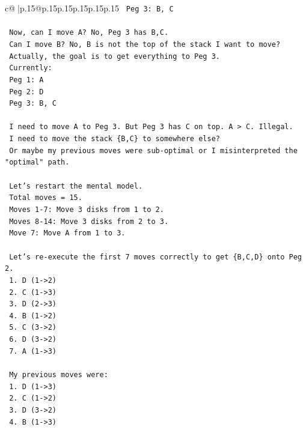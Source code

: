 \documentclass{article}
\begin{document}
{\begin{supertabular}{c@{$\;$}|p{.15\linewidth}@{}p{.15\linewidth}p{.15\linewidth}p{.15\linewidth}p{.15\linewidth}p{.15\linewidth}}
{{{\texttt{    Peg 3: B, C} \\
\\ 
\texttt{    Now, can I move A? No, Peg 3 has B,C.} \\
\texttt{    Can I move B? No, B is not the top of the stack I want to move?} \\
\texttt{    Actually, the goal is to get everything to Peg 3.} \\
\texttt{    Currently:} \\
\texttt{    Peg 1: A} \\
\texttt{    Peg 2: D} \\
\texttt{    Peg 3: B, C} \\
\\ 
\texttt{    I need to move A to Peg 3. But Peg 3 has C on top. A > C. Illegal.} \\
\texttt{    I need to move the stack \{B,C\} to somewhere else?} \\
\texttt{    Or maybe my previous moves were sub{-}optimal or I misinterpreted the "optimal" path.} \\
\\ 
\texttt{    Let's restart the mental model.} \\
\texttt{    Total moves = 15.} \\
\texttt{    Moves 1{-}7: Move 3 disks from 1 to 2.} \\
\texttt{    Moves 8{-}14: Move 3 disks from 2 to 3.} \\
\texttt{    Move 7: Move A from 1 to 3.} \\
\\ 
\texttt{    Let's re{-}execute the first 7 moves correctly to get \{B,C,D\} onto Peg 2.} \\
\texttt{    1. D (1{-}>2)} \\
\texttt{    2. C (1{-}>3)} \\
\texttt{    3. D (2{-}>3)} \\
\texttt{    4. B (1{-}>2)} \\
\texttt{    5. C (3{-}>2)} \\
\texttt{    6. D (3{-}>2)} \\
\texttt{    7. A (1{-}>3)} \\
\\ 
\texttt{    My previous moves were:} \\
\texttt{    1. D (1{-}>3)} \\
\texttt{    2. C (1{-}>2)} \\
\texttt{    3. D (3{-}>2)} \\
\texttt{    4. B (1{-}>3)} \\
}}}
\end{supertabular}}
\end{document}

